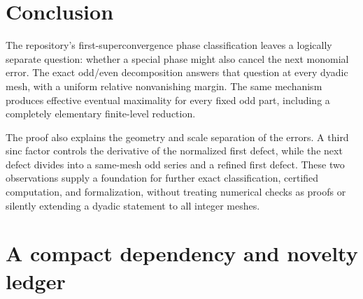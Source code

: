 \documentclass[11pt,a4paper]{article}
\numberwithin{equation}{section}
\theoremstyle{plain}
\theoremstyle{definition}
\theoremstyle{remark}
\begin{document}
\section{Conclusion}

The repository's first-superconvergence phase classification leaves a
logically separate question: whether a special phase might also cancel
the next monomial error. The exact odd/even decomposition answers that
question at every dyadic mesh, with a uniform relative nonvanishing
margin. The same mechanism produces effective eventual maximality for
every fixed odd part, including a completely elementary finite-level
reduction.

The proof also explains the geometry and scale separation of the errors.
A third sinc factor controls the derivative of the normalized first
defect, while the next defect divides into a same-mesh odd series and a
refined first defect. These two observations supply a foundation for
further exact classification, certified computation, and formalization,
without treating numerical checks as proofs or silently extending a
dyadic statement to all integer meshes.

\appendix
\section{A compact dependency and novelty ledger}
\label{app:ledger}
\end{document}
